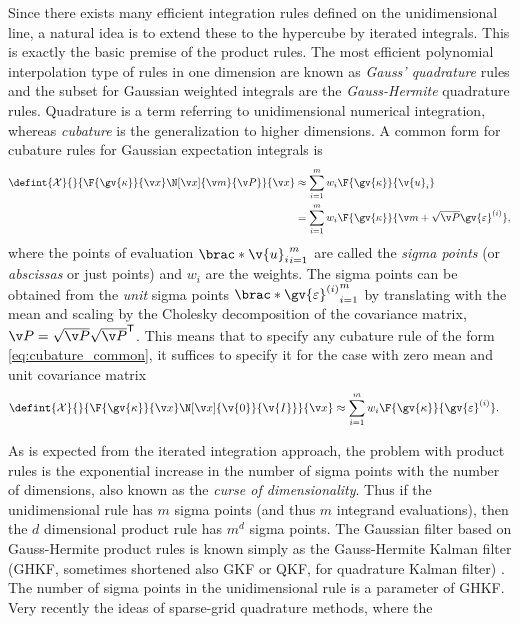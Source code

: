 Since there exists many efficient integration rules defined on the unidimensional line,
a natural idea is to extend these to the hypercube by iterated integrals. This is exactly the 
basic premise of the product rules. The most efficient polynomial interpolation type of rules
in one dimension are known as \emph{Gauss' quadrature} rules and the subset
for Gaussian weighted integrals are the \emph{Gauss-Hermite}
quadrature rules. Quadrature is a term referring to unidimensional numerical integration, whereas
\emph{cubature} is the generalization to higher dimensions. A common form for cubature rules for Gaussian
expectation integrals is
\begin{align}
	\defint{\mathcal{X}}{}{\F{\gv{\kappa}}{\x}\N[\x]{\m}{\P}}{\x} 
	&\approx \sum_{i=1}^m w_i\F{\gv{\kappa}}{\v{u}_i} \label{eq:cubature_common}\\
	&= \sum_{i=1}^m w_i\F{\gv{\kappa}}{\m+\sqrt{\P}\gv{\varepsilon}^{(i)}}\nonumber,
\end{align}
where the points of evaluation $\brac*{\v{u}_i}_{i=1}^m$ are called the \emph{sigma points}
(or \emph{abscissas} or just points) and $w_i$ are the weights. The sigma points
can be obtained from the \emph{unit} sigma points $\brac*{\gv{\varepsilon}^{(i)}}_{i=1}^m$
by translating with the mean and scaling by the Cholesky decomposition of the covariance matrix,
$\P=\sqrt{\P}\sqrt{\P}^\tr$. This means that to specify any cubature rule of the form \eqref{eq:cubature_common}, it suffices
to specify it for the case with zero mean and unit covariance matrix
\begin{align}
	\defint{\mathcal{X}}{}{\F{\gv{\kappa}}{\x}\N[\x]{\v{0}}{\v{I}}}{\x} 
	&\approx \sum_{i=1}^m w_i\F{\gv{\kappa}}{\gv{\varepsilon}^{(i)}}.
\end{align}


As is expected from the iterated integration approach,
the problem with product rules is the exponential increase in the number of sigma points with
the number of dimensions, also known as the \emph{curse of dimensionality}. Thus if the unidimensional rule has $m$ sigma points (and thus $m$ integrand evaluations),
then the $d$ dimensional product rule has $m^d$ sigma points.
The Gaussian filter based
on Gauss-Hermite product rules is known simply as the Gauss-Hermite Kalman filter (GHKF, sometimes shortened also GKF or QKF, for quadrature Kalman filter) \parencite{Ito2000}.
The number of sigma points in the unidimensional rule is a parameter of GHKF.
Very recently the ideas of sparse-grid quadrature methods, where 
the 
 

